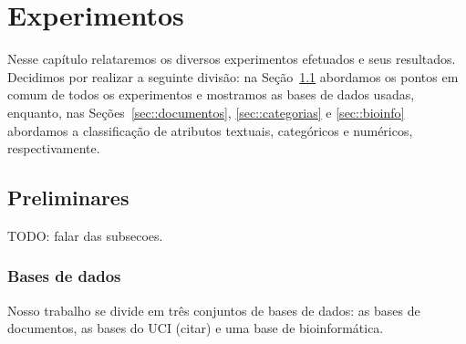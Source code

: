 \newcommand{\triangOK}{\textcolor[rgb]{00,0.45,0.10}{$\blacktriangle$}}
\newcommand{\triangBAD}{\textcolor[rgb]{0.7,00,00}{$\blacktriangledown$}}
\newcommand{\ball}{\textcolor[rgb]{0.7,0.70,0.0}{$\bullet$}}
 	

\chapter{Experimentos}
\label{cap::experimentos}


Nesse capítulo relataremos os diversos experimentos efetuados e seus resultados.
Decidimos por realizar a seguinte divisão: 
na Seção~\ref{sec::preliminares} abordamos os pontos em comum de todos os experimentos e mostramos as bases de dados usadas,
enquanto, nas Seções~\ref{sec::documentos}, \ref{sec::categorias} e \ref{sec::bioinfo} abordamos a classificação de atributos textuais, categóricos e numéricos, respectivamente.

\section{Preliminares}
\label{sec::preliminares}

TODO: falar das subsecoes.

\subsection{Bases de dados}

Nosso trabalho se divide em três conjuntos de bases de dados: as bases de documentos, as bases do UCI (citar) e uma base de bioinformática.

